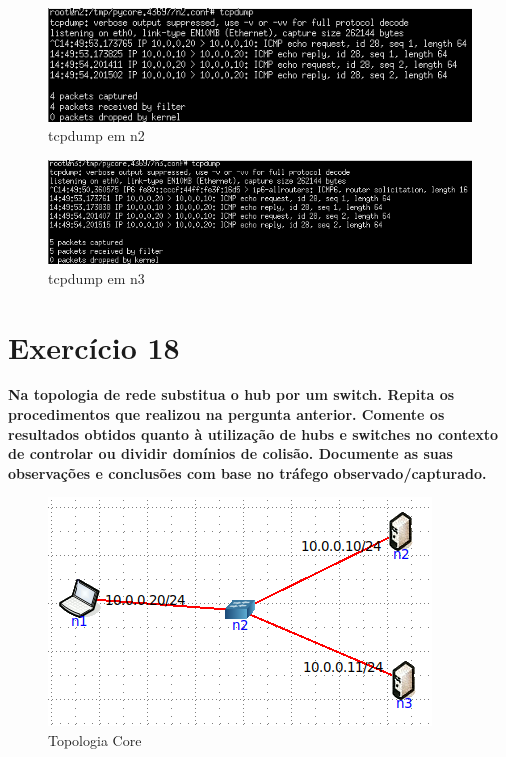 \documentclass[a4paper]{report}
\begin{document}
\begin{figure}[H]
    \centering 
    \includegraphics[width=\textwidth]{images/ex17tcpdumpn2.png}
    \caption{tcpdump em n2}
    \label{fig:ex17tcpdumpn2}
\end{figure}

\begin{figure}[H]
    \centering 
    \includegraphics[width=\textwidth]{images/ex17tcpdumpn3.png}
    \caption{tcpdump em n3}
    \label{fig:ex17tcpdumpn3}
\end{figure}


\section{Exercício 18}
\textbf{Na topologia de rede substitua o hub por um switch. Repita os
procedimentos que realizou na pergunta anterior. Comente os resultados obtidos
quanto à utilização de hubs e switches no contexto de controlar ou dividir
domínios de colisão. Documente as suas observações e conclusões com base no
tráfego observado/capturado.}

\begin{figure}[H]
    \centering 
    \includegraphics[width=\textwidth]{images/ex18topologiacore.png}
    \caption{Topologia Core}
    \label{fig:ex18topologiacore}
\end{figure}
\end{document}
